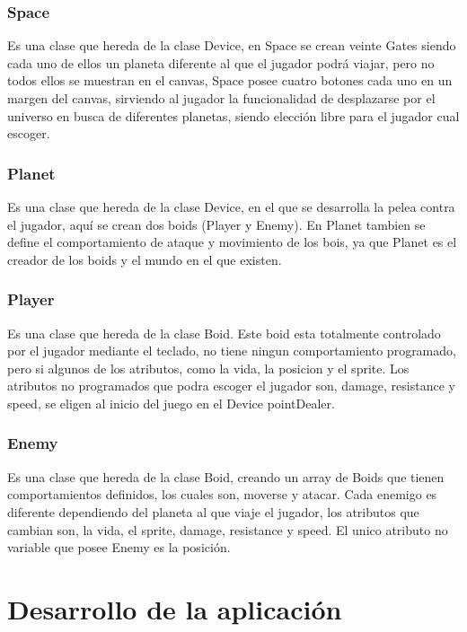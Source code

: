 \documentclass[a4paper,10pt]{article}
\begin{document}
\subsubsection{Space}
Es una clase que hereda de la clase Device, 
en Space se crean veinte Gates siendo cada uno de ellos un planeta
diferente al que el jugador podrá viajar, pero no todos ellos se muestran 
en el canvas, Space posee cuatro botones cada uno en un margen del canvas, 
sirviendo al jugador la funcionalidad de desplazarse por el universo en 
busca de diferentes planetas, siendo elección libre para el jugador cual 
escoger. 

\subsubsection{Planet}
Es una clase que hereda de la clase Device, en el que se desarrolla 
la pelea contra el jugador, aquí se crean dos boids (Player y Enemy).
En Planet tambien se define el comportamiento de ataque y movimiento de 
los bois, ya que Planet es el creador de los boids y el mundo en el 
que existen.

\subsubsection{Player}
Es una clase que hereda de la clase Boid. Este boid esta totalmente 
controlado por el jugador mediante el teclado, no tiene ningun comportamiento 
programado, pero si algunos de los atributos, como la vida, la posicion y
el sprite. Los atributos no programados que podra escoger el jugador son, 
damage, resistance y speed, se eligen al inicio del juego en el Device 
pointDealer.

\subsubsection{Enemy}
Es una clase que hereda de la clase Boid, creando un array de Boids 
que tienen comportamientos definidos, los cuales son, moverse y atacar.
Cada enemigo es diferente dependiendo del planeta al que viaje el jugador, 
los atributos que cambian son, la vida, el sprite, damage, resistance y speed. El unico atributo no variable que posee Enemy es la posición.

\cleardoublepage

\section{Desarrollo de la aplicación}
\end{document}
